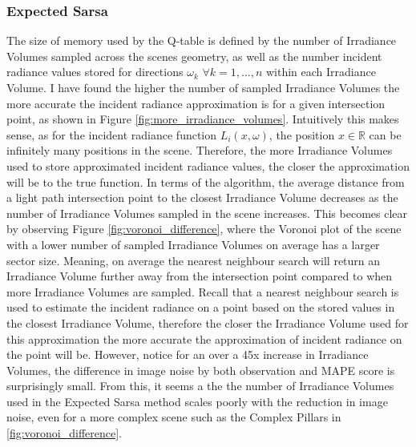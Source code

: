 \documentclass[../dissertation.tex]{subfiles}
\begin{document}
\subsubsection{Expected Sarsa}

The size of memory used by the Q-table is defined by the number of Irradiance Volumes sampled across the scenes geometry, as well as the number incident radiance values stored for directions $\omega_k$ $\forall k = 1,...,n$  within each Irradiance Volume. I have found the higher the number of sampled Irradiance Volumes the more accurate the incident radiance approximation is for a given intersection point, as shown in Figure \ref{fig:more_irradiance_volumes}.  Intuitively this makes sense, as for the incident radiance function $L_i(x, \omega)$, the position $x \in \mathbb{R}$ can be infinitely many positions  in the scene. Therefore, the more Irradiance Volumes used to store approximated incident radiance values, the closer the approximation will be to the true function. In terms of the algorithm, the average distance from a light path intersection point to the closest Irradiance Volume decreases as the number of Irradiance Volumes sampled in the scene increases. This becomes clear by observing Figure \ref{fig:voronoi_difference}, where the Voronoi plot of the scene with a lower number of sampled Irradiance Volumes on average has a larger sector size. Meaning, on average the nearest neighbour search will return an Irradiance Volume further away from the intersection point compared to when more Irradiance Volumes are sampled. Recall that a nearest neighbour search is used to estimate the incident radiance on a point based on the stored values in the closest Irradiance Volume, therefore the closer the Irradiance Volume used for this approximation the more accurate the approximation of incident radiance on the point will be. However, notice for an over a 45x increase in Irradiance Volumes, the difference in image noise by both observation and MAPE score is surprisingly small. From this, it seems a the the number of Irradiance Volumes used in the Expected Sarsa method scales poorly with the reduction in image noise, even for a more complex scene such as the Complex Pillars in \ref{fig:voronoi_difference}.\\
\end{document}
